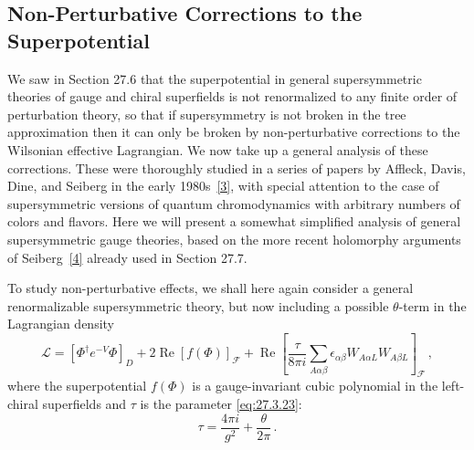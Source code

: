 
\subsection{Non-Perturbative Corrections to the Superpotential}

We saw in Section 27.6 that the superpotential in general supersymmetric
theories of gauge and chiral superfields is not renormalized to any finite
order of perturbation theory, so that if supersymmetry is not broken in the
tree approximation then it can only be broken by non-perturbative
corrections to the Wilsonian effective Lagrangian. We now take up a general
analysis of these corrections. These were thoroughly studied in a series of
papers by Affleck, Davis, Dine, and Seiberg in the early
1980s~\hyperref[ch29-ref-3]{[3]}, with special attention to the case of
supersymmetric versions of quantum chromodynamics with arbitrary numbers
of colors and flavors. Here we will present a somewhat simplified analysis
of general supersymmetric gauge theories, based on the more recent
holomorphy arguments of Seiberg~\hyperref[ch29-ref-4]{[4]} already used in
Section 27.7.

To study non-perturbative effects, we shall here again consider a general
renormalizable supersymmetric theory, but now including a possible
\(\theta\)-term in the Lagrangian density
\begin{equation}
  \mathcal{L}
  =
  \left[\Phi^\dagger e^{-V}\Phi\right]_D
  +2\operatorname{Re}\left[f(\Phi)\right]_{\mathcal{F}}
  +\operatorname{Re}
  \left[
    \frac{\tau}{8\pi i}
    \sum_{A\alpha\beta}
    \epsilon_{\alpha\beta}W_{A\alpha L}W_{A\beta L}
  \right]_{\mathcal{F}}\,,
  \tag{29.3.1}\label{eq:29.3.1}
\end{equation}
where the superpotential \(f(\Phi)\) is a gauge-invariant cubic polynomial
in the left-chiral superfields and \(\tau\) is the parameter
\eqref{eq:27.3.23}:
\begin{equation}
  \tau=\frac{4\pi i}{g^2}+\frac{\theta}{2\pi}\,.
  \tag{29.3.2}\label{eq:29.3.2}
\end{equation}

